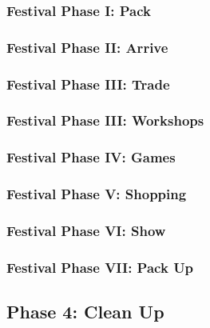			\subsubsection{Festival Phase I: Pack}
			\subsubsection{Festival Phase II: Arrive}
			\subsubsection{Festival Phase III: Trade}
			\subsubsection{Festival Phase III: Workshops}
			\subsubsection{Festival Phase IV: Games}
			\subsubsection{Festival Phase V: Shopping}
			\subsubsection{Festival Phase VI: Show}
			\subsubsection{Festival Phase VII: Pack Up}
		\subsection{Phase 4: Clean Up}
